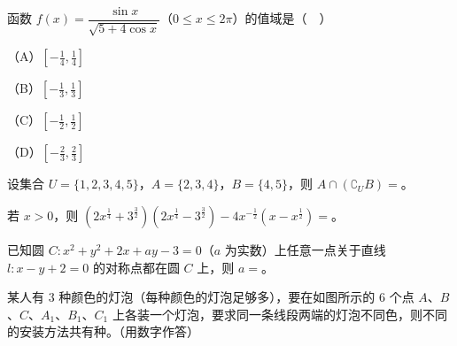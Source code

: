 \begin{question}
函数 $f(x)=\dfrac{\sin x}{\sqrt{5+4\cos x}}$（$0\leqslant x\leqslant2\pi$）的值域是（　）

（A）$\left[-\frac14,\frac14\right]$

（B）$\left[-\frac13,\frac13\right]$

（C）$\left[-\frac12,\frac12\right]$

（D）$\left[-\frac23,\frac23\right]$

\end{question}

\begin{question}
设集合 $U=\{1,2,3,4,5\}$，$A=\{2,3,4\}$，$B=\{4,5\}$，则 $A\cap(\complement_UB)=$\gkblank{}。

\end{question}
\begin{question}
若 $x>0$，则 $\left(2x^{\frac14}+3^{\frac32}\right)\left(2x^{\frac14}-3^{\frac32}\right)-4x^{-\frac12}\left(x-x^{\frac12}\right)=$\gkblank{}。

\end{question}
\begin{question}
已知圆 $C:x^2+y^2+2x+ay-3=0$（$a$ 为实数）上任意一点关于直线 $l:x-y+2=0$ 的对称点都在圆 $C$ 上，则 $a=$\gkblank{}。

\Needspace{0.4\textheight}
\end{question}
\begin{question}
某人有 $3$ 种颜色的灯泡（每种颜色的灯泡足够多），要在如图所示的 $6$ 个点 $A$、$B$、$C$、$A_1$、$B_1$、$C_1$ 上各装一个灯泡，要求同一条线段两端的灯泡不同色，则不同的安装方法共有\gkblank{}种。（用数字作答）
\nopagebreak[4]
\begin{center}\end{center}
\nopagebreak[4]
\end{question}

